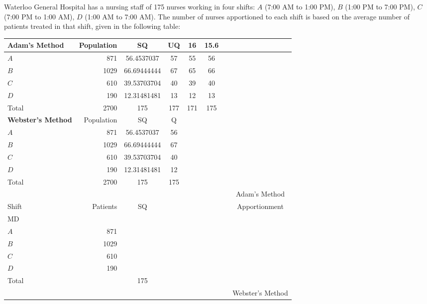 \clearpage
\HOMEWORK
\begin{Denumerate}

	\item Waterloo General Hospital has a nursing staff of 175 nurses working in four shifts: $A$ (7:00 AM to 1:00 PM), $B$ (1:00 PM to 7:00 PM), $C$ (7:00 PM to 1:00 AM), $D$ (1:00 AM to 7:00 AM).  The number of nurses apportioned to each shift is based on the average number of patients treated in that shift, given in the following table:

	\begin{center}
		\begin{tabular}{lr|c|c|c|c|c|c}
	\hline \ifsolns
\textbf{Adam's Method}		 & Population & SQ & UQ & 16 & 15.6\\\hline
 $A$  & 871 & 56.4537037 & 57 & 55 & 56\\\hline
 $B$  & 1029 & 66.69444444 & 67 & 65 & 66\\\hline
 $C$  & 610 & 39.53703704 & 40 & 39 & 40\\\hline
 $D$  & 190 & 12.31481481 & 13 & 12 & 13\\\hline
Total  & 2700 & 175 & 177 & 171 & 175\\\hline\hline

\textbf{Webster's Method}	 & Population & SQ & Q\\\hline
 $A$  & 871 & 56.4537037 & 56\\\hline
 $B$  & 1029 & 66.69444444 & 67\\\hline
 $C$ & 610 & 39.53703704 & 40\\\hline
$D$  & 190 & 12.31481481 & 12\\\hline
Total  & 2700 & 175 & 175\\\hline
\else
	&&&&&&&Adam's Method\\
	
	Shift &	Patients & SQ & \hspace{.75cm} 	& \hspace{.75cm}	& \hspace{.75cm} 	&\hspace{.75cm} 	&  	 	Apportionment \\\hline
MD	&&&&&&&\\\hline
	 $A$ &	871 &&&&&&\\\hline
	 $B$ &	1029&&&&&&\\\hline
	 $C$&	610&&&&&&\\\hline
	$D$ &	190&&&&&&\\\hline
	Total & & 175 &&&&&\\\hline\hline
	&&&&&&&Webster's Method\\
	

\end{tabular}
\end{center}
\end{Denumerate}
